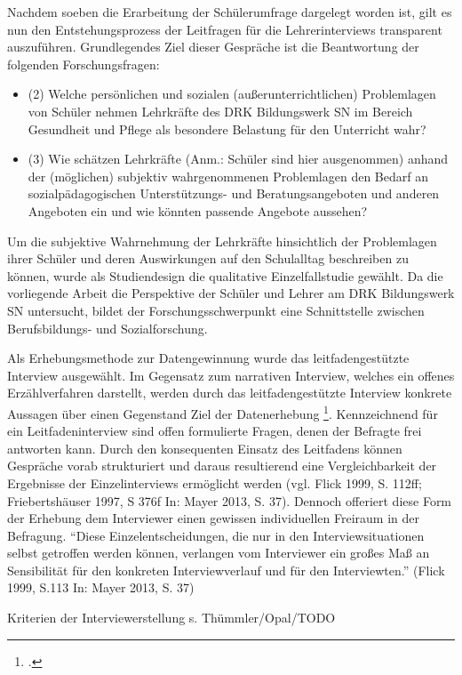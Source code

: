 Nachdem soeben die Erarbeitung der Schülerumfrage dargelegt worden ist, gilt es nun den Entstehungsprozess der Leitfragen für die Lehrerinterviews transparent auszuführen. Grundlegendes Ziel dieser Gespräche ist die Beantwortung der folgenden Forschungsfragen:

\begin{itemize}
	\item (2) Welche persönlichen und sozialen (außerunterrichtlichen) Problemlagen von Schüler nehmen Lehrkräfte des DRK Bildungswerk SN im Bereich Gesundheit und Pflege als besondere Belastung für den Unterricht wahr?
	\item (3) Wie schätzen Lehrkräfte (Anm.: Schüler sind hier ausgenommen) anhand der (möglichen) subjektiv wahrgenommenen Problemlagen den Bedarf an sozialpädagogischen Unterstützungs- und Beratungsangeboten und anderen Angeboten ein und wie könnten passende Angebote aussehen?
\end{itemize}

Um die subjektive Wahrnehmung der Lehrkräfte hinsichtlich der Problemlagen ihrer Schüler und deren Auswirkungen auf den Schulalltag beschreiben zu können, wurde als Studiendesign die qualitative Einzelfallstudie gewählt. Da die vorliegende Arbeit die Perspektive der Schüler und Lehrer am DRK Bildungswerk SN untersucht, bildet der Forschungsschwerpunkt eine Schnittstelle zwischen Berufsbildungs- und Sozialforschung.

Als Erhebungsmethode zur Datengewinnung wurde das leitfadengestützte Interview ausgewählt. Im Gegensatz zum narrativen Interview, welches ein offenes Erzählverfahren darstellt, werden durch das leitfadengestützte Interview konkrete Aussagen über einen Gegenstand Ziel der Datenerhebung \footcite[vgl.][37]{Mayer2013}. Kennzeichnend für ein Leitfadeninterview sind offen formulierte Fragen, denen der Befragte frei antworten kann. Durch den konsequenten Einsatz des Leitfadens können Gespräche vorab strukturiert und daraus resultierend eine Vergleichbarkeit der Ergebnisse der Einzelinterviews ermöglicht werden (vgl. Flick 1999, S. 112ff; Friebertshäuser 1997, S 376f In: Mayer 2013, S. 37). Dennoch offeriert diese Form der Erhebung dem Interviewer einen gewissen individuellen  Freiraum in der Befragung. "`Diese Einzelentscheidungen, die nur in den Interviewsituationen selbst getroffen werden können, verlangen vom Interviewer ein großes Maß an Sensibilität für den konkreten Interviewverlauf und für den Interviewten."' (Flick 1999, S.113 In: Mayer 2013, S. 37) 

Kriterien der Interviewerstellung s. Thümmler/Opal/TODO

